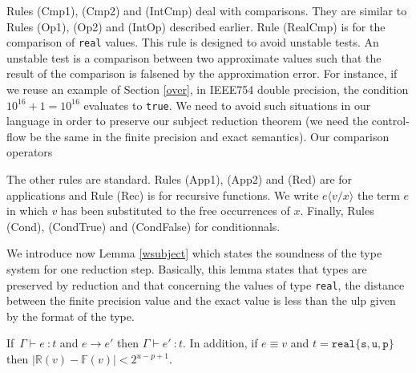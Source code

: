 Rules \textsf{(Cmp1)}, \textsf{(Cmp2)} and \textsf{(IntCmp)} deal with comparisons.
They are similar to Rules \textsf{(Op1)}, \textsf{(Op2)} and \textsf{(IntOp)} described earlier.
Rule \textsf{(RealCmp)} is for the comparison of \texttt{real} values. This rule is designed
to avoid unstable tests. An unstable test is a comparison between two approximate values
such that the result of the comparison is falsened by the approximation error.
For instance, if we reuse an example of Section \ref{over}, in IEEE754 double precision,
the condition $10^{16}+1=10^{16}$ evaluates to \texttt{true}. We need to avoid such situations
in our language in order to preserve our subject reduction theorem (we need the control-flow
be the same in the finite precision and exact semantics). 
Our comparison operators 

The other rules are standard. Rules \textsf{(App1)}, \textsf{(App2) and \textsf{(Red)}}
are for applications and Rule \textsf{(Rec)} is for recursive functions. 
 We write $e\langle v/x\rangle$ the term $e$ in which $v$ has been substituted
to the free occurrences of $x$. Finally, Rules \textsf{(Cond)}, \textsf{(CondTrue)} and \textsf{(CondFalse)} for
conditionnals.

We introduce now Lemma \ref{wsubject} which states the soundness of the type system for one
reduction step. Basically, this lemma states that types are preserved by reduction and that 
concerning the values of type \texttt{real}, the distance between the finite precision value
and the exact value is less than the \textsf{ulp} given by the format of the type.


\begin{lemma}
\label{wsubject}
If\ $\Gamma \vdash e\ : t$ and $e\rightarrow e'$ then $\Gamma \vdash e'\ : t$. In addition,
if $e\equiv v$ and $t=\mathtt{real\{s,u,p\}}$ then $|\mathbb{R}(v)-\mathbb{F}(v)|< 2^{u-p+1}$.
\end{lemma} 

